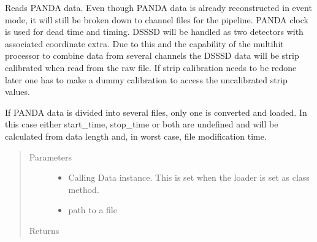 \documentclass[letterpaper,10pt,english]{sphinxmanual}
\begin{document}
\begin{fulllineitems}
\label{\detokenize{autodocs/loaders:listmode.loaders.panda_loader}}
\sphinxAtStartPar
Reads PANDA data. Even though PANDA data is already reconstructed in event mode, it will still be broken down
to channel files for the pipeline. PANDA clock is used for dead time and timing. DSSSD will be handled as two
detectors with associated coordinate extra. Due to this and the capability of the multi\sphinxhyphen{}hit processor to combine
data from several channels the DSSSD data will be strip calibrated when read from the raw file. If strip calibration
needs to be redone later one has to make a dummy calibration to access the uncalibrated strip values.

\sphinxAtStartPar
If PANDA data is divided into several files, only one is converted and loaded. In this case either start\_time,
stop\_time or both are undefined and will be calculated from data length and, in worst case, file modification
time.
\begin{quote}\begin{description}
\item[{Parameters}] \leavevmode\begin{itemize}
\item {} 
\sphinxAtStartPar
{} \textendash{} Calling Data instance. This is set when the loader is set as class method.

\item {} 
\sphinxAtStartPar
{} \textendash{} path to a file

\end{itemize}

\item[{Returns}] \leavevmode
\sphinxAtStartPar


\end{description}\end{quote}

\end{fulllineitems}


\begin{fulllineitems}
\label{\detokenize{autodocs/loaders:listmode.loaders.pixie4_loader}}
\end{fulllineitems}
\end{document}
